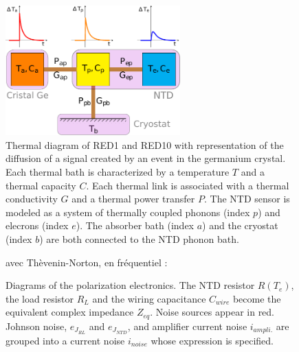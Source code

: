 \begin{figure}[!ht]
%	
\begin{center}
\includegraphics[width=0.6\textwidth]{Images/thermal_scheme.pdf}
\end{center}
\caption{Thermal diagram of RED1 and RED10 with representation of the diffusion of a signal created by an event in the germanium crystal. Each thermal bath is characterized by a temperature $T$ and a thermal capacity $C$. Each thermal link is associated with a thermal conductivity $G$ and a thermal power transfer $P$. The NTD sensor is modeled as a system of thermally coupled phonons (index $p$) and elecrons (index $e$). The absorber bath (index $a$) and the cryostat (index $b$) are both connected to the NTD phonon bath.}
\label{thermal-scheme}
\end{figure}

\begin{figure}[!ht]
\begin{minipage}[c]{0.45\textwidth}
\resizebox{!}{\textwidth}{%
\begin{circuitikz}[scale=1]
	
\end{circuitikz}
}%
\end{minipage}
\hfill
\vrule{}
\hfill
\begin{minipage}[c]{0.45\textwidth}
\begin{center}
avec Thèvenin-Norton, en fréquentiel :
\end{center}
\resizebox{\textwidth}{!}{%
\begin{circuitikz}
	
\end{circuitikz}
}%
\end{minipage}
\caption{Diagrams of the polarization electronics. The NTD resistor $R(T_e)$, the load resistor $R_L$ and the wiring capacitance $C_{wire}$ become the equivalent complex impedance $Z_{eq}$. Noise sources appear in red. Johnson noise, $e_{J_{RL}}$ and $e_{J_{NTD}}$, and amplifier current noise $i_{ampli.}$ are grouped into a current noise $i_{noise}$ whose expression is specified.}
\label{electric-scheme}
\end{figure}

